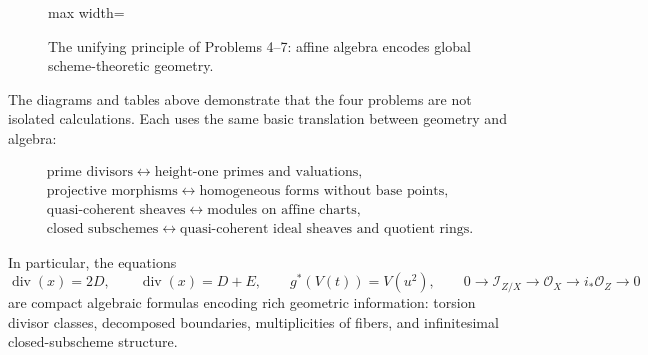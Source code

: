 \documentclass[12pt,a4paper]{article}
\theoremstyle{notespace}
\begin{document}
\begin{figure}[htbp]
\begin{adjustbox}{max width=\textwidth}
	\end{adjustbox}
	\caption{The unifying principle of Problems 4--7: affine algebra encodes global scheme-theoretic geometry.}
	\label{fig:final-concept-map}
\end{figure}

The diagrams and tables above demonstrate that the four problems are not isolated calculations. Each uses the same basic translation between geometry and algebra:

\[
\boxed{
	\begin{array}{c}
		\text{prime divisors}
		\longleftrightarrow
		\text{height-one primes and valuations},
		\\[4pt]
		\text{projective morphisms}
		\longleftrightarrow
		\text{homogeneous forms without base points},
		\\[4pt]
		\text{quasi-coherent sheaves}
		\longleftrightarrow
		\text{modules on affine charts},
		\\[4pt]
		\text{closed subschemes}
		\longleftrightarrow
		\text{quasi-coherent ideal sheaves and quotient rings}.
	\end{array}
}
\]

In particular, the equations
\[
\operatorname{div}(x)=2D,
\qquad
\operatorname{div}(x)=D+E,
\qquad
g^*(V(t))=V(u^2),
\qquad
0\to\mathcal I_{Z/X}\to\mathcal O_X\to i_*\mathcal O_Z\to0
\]
are compact algebraic formulas encoding rich geometric information: torsion divisor classes, decomposed boundaries, multiplicities of fibers, and infinitesimal closed-subscheme structure.
\end{document}
